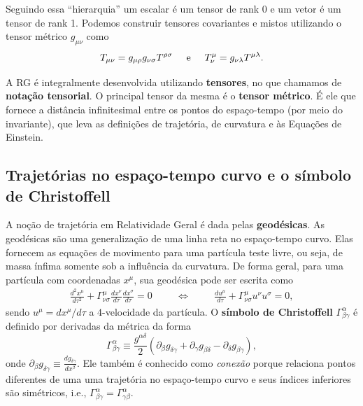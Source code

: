 \documentclass[12pt,a4paper,titlepage,brazil]{article}
\begin{document}
Seguindo essa ``hierarquia'' um escalar é um tensor de rank 0 e um vetor é um tensor de rank 1. Podemos construir tensores covariantes e mistos utilizando o tensor métrico $g_{\mu \nu}$ como
\begin{equation}
 T_{\mu \nu} = g_{\mu \rho} g_{\nu \sigma} T^{\rho \sigma} \hspace{0.5cm}\textnormal{e}\hspace{0.5cm} T^{\mu}_{\nu} = g_{\nu \lambda} T^{\mu \lambda} .
\end{equation}

A RG é integralmente desenvolvida utilizando {\bf tensores}, no que chamamos de {\bf notação tensorial}. O principal tensor da mesma é o {\bf tensor métrico}. É ele que fornece a distância infinitesimal entre os pontos do espaço-tempo (por meio do invariante), que leva as definições de trajetória, de curvatura e às Equações de Einstein.


\subsection{Trajetórias no espaço-tempo curvo e o símbolo de Christoffell}

A noção de trajetória em Relatividade Geral é dada pelas \textbf{geodésicas}. As geodésicas são uma generalização de uma linha reta no espaço-tempo curvo. Elas fornecem as equações de movimento para uma partícula teste livre, ou seja, de massa ínfima somente sob a influência da curvatura. De forma geral, para uma partícula com coordenadas $x^{\mu}$, sua geodésica pode ser escrita como
\begin{eqnarray}
 \frac{d^2 x^{\mu}}{d \tau^2} + \Gamma^{\mu}_{\nu \sigma} \frac{d x^{\nu}}{d\tau}
\frac{d x^{\sigma}}{d\tau} = 0  \hspace{1cm} \Longleftrightarrow \hspace{1cm} 
 \frac{d u^{\mu}}{d\tau} + \Gamma^{\mu}_{\nu \sigma} u^{\nu} u^{\sigma}  =  0 ,
\end{eqnarray}
sendo $u^{\mu} = d x^{\mu}/d \tau$ a $4$-velocidade da partícula. O {\bf símbolo de Christoffell} $\Gamma^{\alpha}_{\beta \gamma}$ é definido por derivadas da métrica da forma
\begin{equation}
 \label{eq:christoffel}
 \Gamma^{\alpha}_{\beta \gamma} \equiv \frac{g^{\alpha \delta}}{2} \left( \partial_{\beta} g_{\delta \gamma} + \partial_{\gamma} g_{\beta \delta} - \partial_{\delta} g_{\beta \gamma} \right) ,
\end{equation}
onde $\partial_{\beta} g_{\delta \gamma} \equiv \frac{d g_{\delta \gamma}}{d x^{\beta}}$. Ele também é conhecido como \textit{conexão} porque relaciona pontos diferentes de uma uma trajetória no espaço-tempo curvo e seus índices inferiores são simétricos, i.e., $\Gamma^{\alpha}_{\beta \gamma} = \Gamma^{\alpha}_{\gamma \beta}$.
\end{document}
